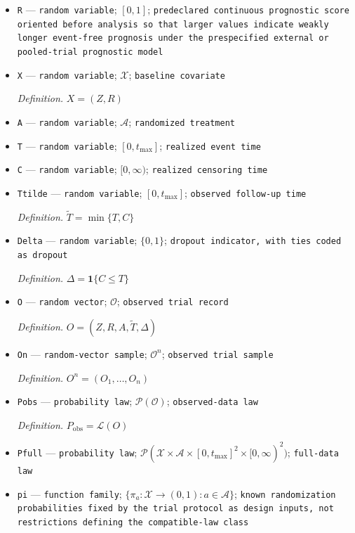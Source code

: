 \documentclass{article}
\begin{document}
\begin{itemize}
  \item \texttt{R} --- \texttt{random variable}; \([0,1]\); \texttt{predeclared continuous prognostic score oriented before analysis so that larger values indicate weakly longer event-\allowbreak{}free prognosis under the prespecified external or pooled-\allowbreak{}trial prognostic model}
  \item \texttt{X} --- \texttt{random variable}; \(\mathcal X\); \texttt{baseline covariate}
  \par\smallskip\noindent\emph{Definition.} \(X=(Z,R)\)
  \item \texttt{A} --- \texttt{random variable}; \(\mathcal A\); \texttt{randomized treatment}
  \item \texttt{T} --- \texttt{random variable}; \([0,t_{\max}]\); \texttt{realized event time}
  \item \texttt{C} --- \texttt{random variable}; \([0,\infty)\); \texttt{realized censoring time}
  \item \texttt{Ttilde} --- \texttt{random variable}; \([0,t_{\max}]\); \texttt{observed follow-\allowbreak{}up time}
  \par\smallskip\noindent\emph{Definition.} \(\widetilde T=\min\{T,C\}\)
  \item \texttt{Delta} --- \texttt{random variable}; \(\{0,1\}\); \texttt{dropout indicator,\allowbreak{} with ties coded as dropout}
  \par\smallskip\noindent\emph{Definition.} \(\Delta=\mathbf 1\{C\le T\}\)
  \item \texttt{O} --- \texttt{random vector}; \(\mathcal O\); \texttt{observed trial record}
  \par\smallskip\noindent\emph{Definition.} \(O=(Z,R,A,\widetilde T,\Delta)\)
  \item \texttt{On} --- \texttt{random-\allowbreak{}vector sample}; \(\mathcal O^n\); \texttt{observed trial sample}
  \par\smallskip\noindent\emph{Definition.} \(O^n=(O_1,\ldots,O_n)\)
  \item \texttt{Pobs} --- \texttt{probability law}; \(\mathcal P(\mathcal O)\); \texttt{observed-\allowbreak{}data law}
  \par\smallskip\noindent\emph{Definition.} \(P_{\mathrm{obs}}=\mathcal L(O)\)
  \item \texttt{Pfull} --- \texttt{probability law}; \(\mathcal P(\mathcal X\times\mathcal A\times[0,t_{\max}]^2\times[0,\infty)^2)\); \texttt{full-\allowbreak{}data law}
  \item \texttt{pi} --- \texttt{function family}; \(\{\pi_a:\mathcal X\to(0,1):a\in\mathcal A\}\); \texttt{known randomization probabilities fixed by the trial protocol as design inputs,\allowbreak{} not restrictions defining the compatible-\allowbreak{}law class}

\end{itemize}
\end{document}
